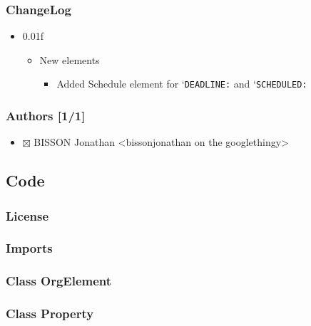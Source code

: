 \documentclass[11pt]{article}
\begin{document}
\subsubsection{ChangeLog}
\label{sec-1_2_3}
\begin{itemize}

\item 0.01f
\label{sec-1_2_3_1}%
\begin{itemize}

\item New elements
\label{sec-1_2_3_1_1}%
\begin{itemize}
\item Added Schedule element for `\texttt{DEADLINE:} and `\texttt{SCHEDULED:}
\end{itemize}


\end{itemize} %
\end{itemize} %
\subsubsection{Authors [1/1]}
\label{sec-1_2_4}

\begin{itemize}
\item $\boxtimes$ BISSON Jonathan <bissonjonathan on the googlethingy>
\end{itemize}
\subsection{Code}
\label{sec-1_3}
\subsubsection{License}
\label{sec-1_3_1}
\label{31a46da7-f49b-4826-9c46-1513054f6202}
\subsubsection{Imports}
\label{sec-1_3_2}
\label{5fa2a7a6-476a-43c2-81f4-0fee4ee86fe2}
\subsubsection{Class OrgElement}
\label{sec-1_3_3}
\label{caea64f7-03b1-4f45-8abe-81819d89c6a9}
\subsubsection{Class Property}
\label{sec-1_3_4}
\label{8dec0cc1-918d-4282-8549-07efa0f3c4cc}
\end{document}
